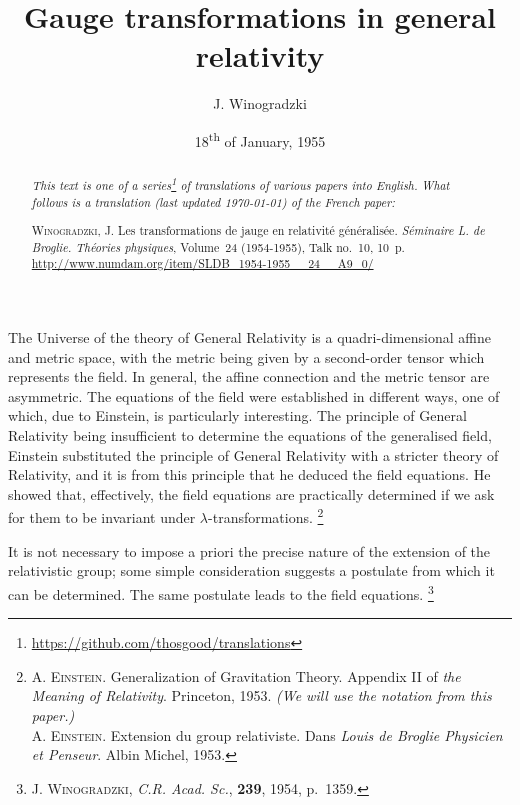 \documentclass{article}
\theoremstyle{plain}
\theoremstyle{definition}
\newcommand{\oldpage}[1]{\marginpar{\footnotesize$\Big\vert$ \textit{p.~#1}}}
\begin{document}
\renewcommand{\abstractname}{Translator's note.}

\title{Gauge transformations in general relativity}
\author{J. Winogradzki}
\date{18\textsuperscript{th} of January, 1955}
\maketitle

\begin{abstract}
  \renewcommand*{\thefootnote}{\fnsymbol{footnote}}
  \emph{This text is one of a series\footnote{\url{https://github.com/thosgood/translations}} of translations of various papers into English.}
  \emph{What follows is a translation (last updated \today) of the French paper:}

  \medskip\noindent
  \textsc{Winogradzki, J}. Les transformations de jauge en relativité généralisée. \emph{Séminaire L. de Broglie. Théories physiques}, Volume~24 (1954-1955), Talk no.~10, 10~p. {\footnotesize\url{http://www.numdam.org/item/SLDB_1954-1955__24__A9_0/}}
\end{abstract}

\setcounter{footnote}{0}

\tableofcontents



\bigskip\bigskip
\oldpage{10-01}
The Universe of the theory of General Relativity is a quadri-dimensional affine and metric space, with the metric being given by a second-order tensor which represents the field.
In general, the affine connection and the metric tensor are asymmetric.
The equations of the field were established in different ways, one of which, due to Einstein, is particularly interesting.
The principle of General Relativity being insufficient to determine the equations of the generalised field, Einstein substituted the principle of General Relativity with a stricter theory of Relativity, and it is from this principle that he deduced the field equations.
He showed that, effectively, the field equations are practically determined if we ask for them to be invariant under $\lambda$-transformations.
\footnote{\label{footnote1}\textsc{A. Einstein}. Generalization of Gravitation Theory. Appendix II of \emph{the Meaning of Relativity}. Princeton, 1953. \emph{(We will use the notation from this paper.)}\\\textsc{A. Einstein}. Extension du group relativiste. Dans \emph{Louis de Broglie Physicien et Penseur}. Albin Michel, 1953.}

It is not necessary to impose a priori the precise nature of the extension of the relativistic group; some simple consideration suggests a postulate from which it can be determined.
The same postulate leads to the field equations.
\footnote{\textsc{J. Winogradzki}, \emph{C.R. Acad. Sc.}, \textbf{239}, 1954, p.~1359.}
\end{document}

